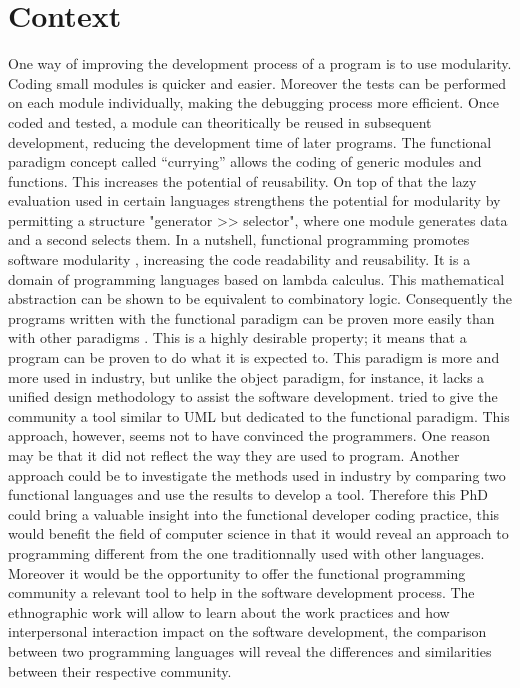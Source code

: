 \documentclass[12p]{article}
\begin{document}
\section*{Context}
One way of improving the development process of a program is to use
modularity. Coding small modules is quicker and easier. Moreover the
tests can be performed on each module individually, making the
debugging process more efficient. Once coded and tested, a module can
theoritically be reused in subsequent development, reducing the
development time of later programs. The functional paradigm concept
called ``currying'' allows the coding of generic modules and
functions.  This increases the potential of reusability. On top of
that the lazy evaluation used in certain languages strengthens the
potential for modularity by permitting a structure "generator >>
selector", where one module generates data and a second selects
them. In a nutshell, functional programming promotes software
modularity \citep{hughes_why_1989}, increasing the code readability
and reusability. It is a domain of programming languages based on
lambda calculus. This mathematical abstraction can be shown to be
equivalent to combinatory logic. Consequently the programs written
with the functional paradigm can be proven more easily than with other
paradigms \citep{wadler_theorems_1989,voigtlander_proving_2008}. This
is a highly desirable property; it means that a program can be proven
to do what it is expected to. This paradigm is more and more used in
industry, but unlike the object paradigm, for instance, it lacks a
unified design methodology to assist the software
development. \citet{russell_FAD_2001} tried to give the community a
tool similar to UML but dedicated to the functional paradigm. This
approach, however, seems not to have convinced the programmers. One
reason may be that it did not reflect the way they are used to
program. Another approach could be to investigate the methods used in
industry by comparing two functional languages and use the results to
develop a tool. Therefore this PhD could bring a valuable insight into
the functional developer coding practice, this would benefit the field
of computer science in that it would reveal an approach to programming
different from the one traditionnally used with other
languages. Moreover it would be the opportunity to offer the
functional programming community a relevant tool to help in the
software development process. The ethnographic work will allow to
learn about the work practices and how interpersonal interaction
impact on the software development, the comparison between two
programming languages will reveal the differences and similarities
between their respective community.\\
\end{document}
